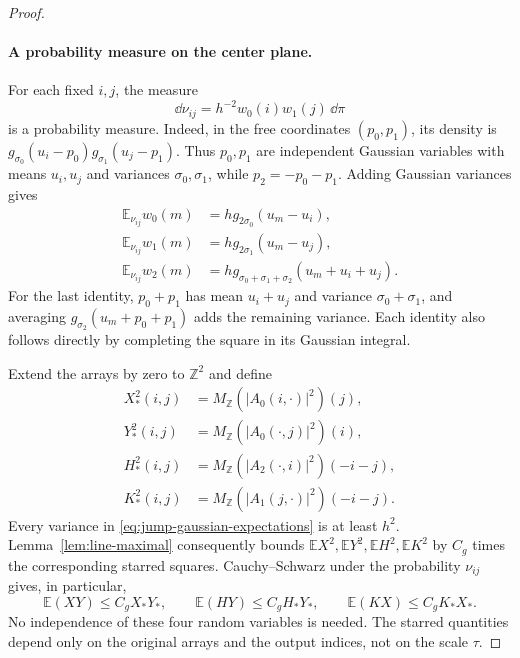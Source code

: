 \begin{proof}
\paragraph{A probability measure on the center plane.}
For each fixed $i,j$, the measure
\[
 \dd\nu_{ij}=h^{-2}w_0(i)w_1(j)\,\dd\pi
\]
is a probability measure.  Indeed, in the free coordinates $(p_0,p_1)$,
its density is
$g_{\sigma_0}(u_i-p_0)g_{\sigma_1}(u_j-p_1)$.
Thus $p_0,p_1$ are independent Gaussian variables with means
$u_i,u_j$ and variances $\sigma_0,\sigma_1$, while
$p_2=-p_0-p_1$.  Adding Gaussian variances gives
\begin{equation}\label{eq:jump-gaussian-expectations}
 \begin{aligned}
 \mathbb E_{\nu_{ij}}w_0(m)
     &=h g_{2\sigma_0}(u_m-u_i),\\
 \mathbb E_{\nu_{ij}}w_1(m)
     &=h g_{2\sigma_1}(u_m-u_j),\\
 \mathbb E_{\nu_{ij}}w_2(m)
     &=h g_{\sigma_0+\sigma_1+\sigma_2}(u_m+u_i+u_j).
 \end{aligned}
\end{equation}
For the last identity, $p_0+p_1$ has mean $u_i+u_j$ and variance
$\sigma_0+\sigma_1$, and averaging $g_{\sigma_2}(u_m+p_0+p_1)$
adds the remaining variance.  Each identity also follows directly
by completing the square in its Gaussian integral.

Extend the arrays by zero to $\mathbb Z^2$ and define
\begin{equation}\label{eq:jump-starred-majorants}
 \begin{aligned}
 X_*^2(i,j)&=M_{\mathbb Z}(|A_0(i,\cdot)|^2)(j),\\
 Y_*^2(i,j)&=M_{\mathbb Z}(|A_0(\cdot,j)|^2)(i),\\
 H_*^2(i,j)&=M_{\mathbb Z}(|A_2(\cdot,i)|^2)(-i-j),\\
 K_*^2(i,j)&=M_{\mathbb Z}(|A_1(j,\cdot)|^2)(-i-j).
 \end{aligned}
\end{equation}
Every variance in \eqref{eq:jump-gaussian-expectations} is at least
$h^2$.  Lemma~\ref{lem:line-maximal} consequently bounds
$\mathbb E X^2,\mathbb E Y^2,\mathbb E H^2,\mathbb E K^2$ by
$C_g$ times the corresponding starred squares.  Cauchy--Schwarz
under the probability $\nu_{ij}$ gives, in particular,
\[
 \mathbb E(XY)\le C_gX_*Y_*,\qquad
 \mathbb E(HY)\le C_gH_*Y_*,\qquad
 \mathbb E(KX)\le C_gK_*X_*.
\]
No independence of these four random variables is needed.
The starred quantities depend only on the original arrays and the
output indices, not on the scale $\tau$.


\end{proof}
